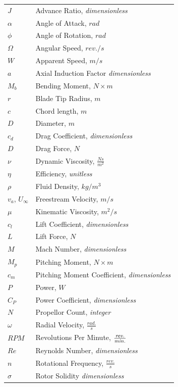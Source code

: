 \documentclass[journal ]{new-aiaa}
\begin{document}
{\renewcommand\arraystretch{1.0}
\noindent\begin{longtable*}{@{}l @{\quad=\quad} l@{}}

$J$ & Advance Ratio, \emph{dimensionless} \\
$\alpha$ & Angle of Attack, $rad$ \\
$\phi$ & Angle of Rotation, $rad$ \\
$\Omega$ & Angular Speed, $rev./s$ \\
$W$ & Apparent Speed, $m/s$ \\
$a$ & Axial Induction Factor \emph{dimensionless} \\
$M_{b}$ & Bending Moment, $N \times m$ \\
$r$ & Blade Tip Radius, $m$ \\
$c$ & Chord length, $m$ \\
$D$ & Diameter, $m$ \\
$c_{d}$ & Drag Coefficient, \emph{dimensionless} \\
$D$ & Drag Force, $N$ \\
$\nu$ & Dynamic Viscosity, $\frac{N s}{m^{2}}$ \\
$\eta$ & Efficiency, \emph{unitless} \\
$\rho$ & Fluid Density, $kg/m^{3}$ \\
$v_{a}$, $U_{\infty}$ & Freestream Velocity, $m/s$ \\
$\mu$ & Kinematic Viscosity, $m^{2}/s$ \\
$c_{l}$ & Lift Coefficient, \emph{dimensionless} \\
$L$ & Lift Force, $N$ \\
$M$ & Mach Number, \emph{dimensionless} \\
$M_{p}$ & Pitching Moment, $N \times m$ \\
$c_{m}$ & Pitching Moment Coefficient, \emph{dimensionless} \\
$P$ & Power, $W$ \\
$C_{P}$ & Power Coefficient, \emph{dimensionless} \\
$N$ & Propellor Count, \emph{integer} \\
$\omega$ & Radial Velocity, $\frac{rad.}{s}$ \\
$RPM$ & Revolutions Per Minute, $\frac{\emph{rev.}}{\emph{min.}}$ \\
$Re$ & Reynolds Number, \emph{dimensionless} \\
$n$ & Rotational Frequency, $\frac{rev.}{s}$ \\
$\sigma$ & Rotor Solidity \emph{dimensionless} \\

\end{longtable*}}
\end{document}
